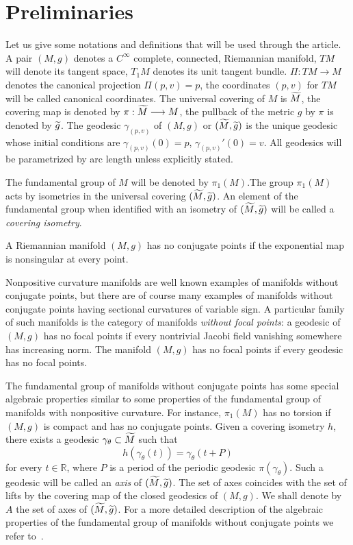 \documentclass[AHL,Unicode,longabstracts,published]{cedram}
\newcommand{\bbR}{\mathbb{R}}
\let\oldtilde\tilde
\renewcommand*{\tilde}[1]{\mathchoice{\widetilde{#1}}{\widetilde{#1}}{\oldtilde{#1}}{\oldtilde{#1}}}
\begin{document}
\section{Preliminaries}\label{SECpreliminaries}

Let us give some notations and definitions that will be used through the article. A pair $(M,g)$ denotes a $C^{\infty}$ complete, connected, Riemannian manifold, $TM$ will denote its tangent space, $T_{1}M$ denotes its unit tangent bundle. $\Pi: TM \longrightarrow M$ denotes the canonical projection $\Pi(p,v) = p$, the coordinates $(p,v)$ for $TM$ will be called canonical coordinates. The universal covering of $M$ is $\tilde{M}$, the covering map is denoted by $\pi:\tilde{M} \longrightarrow M$, the pullback of the metric $g$ by $\pi$ is denoted by $\tilde{g}$. The geodesic $\gamma_{(p,v)}$ of $(M,g)$ or $(\tilde{M},\tilde{g})$ is the unique geodesic whose initial conditions are $\gamma_{(p,v)}(0)=p$, $\gamma_{(p,v)}'(0)= v$. All geodesics will be parametrized by arc length unless explicitly stated.

The fundamental group of $M$ will be denoted by $\pi_{1}(M)$.The group $\pi_{1}(M)$ acts by isometries in the universal covering $(\tilde{M}, \tilde{g})$. An element of the fundamental group when identified with an isometry of $(\tilde{M}, \tilde{g})$ will be called a \emph{covering isometry}.

\begin{defi}
A Riemannian manifold $(M,g)$ has no conjugate points if the exponential map is nonsingular at every point.
\end{defi}

Nonpositive curvature manifolds are well known examples of manifolds without conjugate points, but there are of course many examples of manifolds without conjugate points having sectional curvatures of variable sign. A particular family of such manifolds is the category of manifolds \emph{without focal points}: a geodesic of $(M,g)$ has no focal points if every nontrivial Jacobi field vanishing somewhere has increasing norm. The manifold $(M,g)$ has no focal points if every geodesic has no focal points.

The fundamental group of manifolds without conjugate points has some special algebraic properties similar to some properties of the fundamental group of manifolds with nonpositive curvature. For instance, $\pi_{1}(M)$ has no torsion if $(M,g)$ is compact and has no conjugate points. Given a covering isometry $h$, there exists a geodesic $\gamma_{\theta} \subset \tilde{M}$ such that
\[
h (\gamma_{\theta}(t)) = \gamma_{\theta}(t + P)
\]
for every $t \in \bbR$, where $P$ is a period of the periodic geodesic $\pi(\gamma_{\theta})$. Such a geodesic will be called an \emph{axis} of $(\tilde{M}, \tilde{g})$. The set of axes coincides with the set of lifts by the covering map of the closed geodesics of $(M,g)$. We shall denote by $A$ the set of axes of $(\tilde{M}, \tilde{g})$. For a more detailed description of the algebraic properties of the fundamental group of manifolds without conjugate points we refer to~\cite{kn:CS}.
\end{document}
